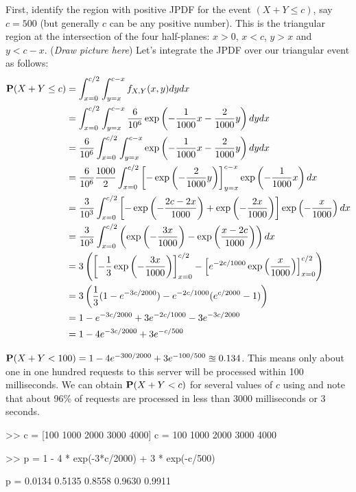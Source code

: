 \begin{example}
{}
\item
First, identify the region with positive JPDF for the event $(X+Y \leq c)$, say $c=500$ (but generally $c$ can be any positive number).
This is the triangular region at the intersection of the four half-planes: $x>0$, $x < c$, $y>x$ and $y<c-x$. ({\em Draw picture here})
Let's integrate the JPDF over our triangular event as follows:
{\scriptsize
\begin{align*}
\mathbf{P}(X+Y \leq c) 
&= \int_{x=0}^{c/2}\int_{y=x}^{c-x} f_{X,Y}(x,y) dy dx \\
&= \int_{x=0}^{c/2}\int_{y=x}^{c-x} \frac{6}{10^6} \exp \left( -\frac{1}{1000}x-\frac{2}{1000}y \right) dy dx \\
&= \frac{6}{10^6} \int_{x=0}^{c/2}\int_{y=x}^{c-x}  \exp \left( -\frac{1}{1000}x-\frac{2}{1000}y \right) dy dx \\
&= \frac{6}{10^6} \frac{1000}{2} \int_{x=0}^{c/2} \left[ - \exp \left( -\frac{2}{1000}y \right) \right]_{y=x}^{c-x}  \exp \left(-\frac{1}{1000}x\right) dx\\
&= \frac{3}{10^3} \int_{x=0}^{c/2} \left[ - \exp \left( -\frac{2c-2x}{1000} \right) + \exp \left( -\frac{2x}{1000} \right) \right]  \exp \left(-\frac{x}{1000}\right) dx\\
&= \frac{3}{10^3} \int_{x=0}^{c/2} \left(  \exp \left( -\frac{3x}{1000} \right) - \exp \left( \frac{x-2c}{1000} \right) \right)  dx\\
&= 3 \left( \left[-\frac{1}{3} \exp \left( -\frac{3x}{1000} \right) \right]_{x=0}^{c/2} - \left[ e^{-2c/1000} \exp \left( \frac{x}{1000} \right)\right]_{x=0}^{c/2} \right)  \\
&= 3  \left(\frac{1}{3} (1-e^{-3c/2000}) - e^{-2c/1000} (e^{c/2000}-1) \right)\\
&= 1 - e^{-3c/2000} + 3 e^{-2c/1000} - 3 e^{-3c/2000}\\
&= 1 - 4 e^{-3c/2000} + 3 e^{-c/500}
\end{align*}
}
\item $\mathbf{P}(X+Y<100) = 1 - 4 e^{-300/2000} + 3 e^{-100/500} \approxeq 0.134$.  This means only about one in one hundred requests to this server will be processed within 100 milliseconds.
\ee
We can obtain $\mathbf{P}(X+Y<c)$ for several values of $c$ using \Matlab and note that about 96\% of requests are processed in less than 3000 milliseconds or 3 seconds.
\begin{VrbM}
>> c = [100 1000 2000 3000 4000]
c =  100        1000        2000        3000        4000

>> p = 1 - 4 * exp(-3*c/2000) + 3 * exp(-c/500)

p =  0.0134     0.5135      0.8558      0.9630      0.9911
\end{VrbM}
\end{example}

